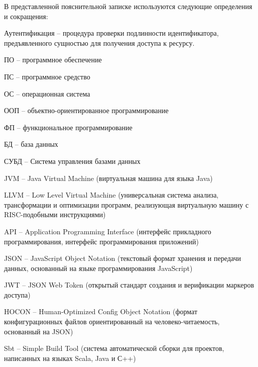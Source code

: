 
В представленной пояснительной записке используются следующие определения и сокращения:

Аутентификация -- процедура проверки подлинности идентификатора, предъявленного сущностью для получения доступа к ресурсу.

ПО -- программное обеспечение

ПС – программное средство

ОС -- операционная система

ООП -- объектно-ориентированное программирование

ФП -- функциональное программирование

БД -- база данных

СУБД -- Система управления базами данных

JVM -- Java Virtual Machine (виртуальная машина для языка Java)

LLVM -- Low Level Virtual Machine (универсальная система анализа, трансформации и оптимизации программ, реализующая виртуальную машину с RISC-подобными инструкциями)

API -- Application Programming Interface (интерфейс прикладного программирования, интерфейс программирования приложений)

JSON -- JavaScript Object Notation (текстовый формат хранения и передачи данных, основанный на языке программирования JavaScript)

JWT -- JSON Web Token (открытый стандарт создания и верификации маркеров доступа)

HOCON -- Human-Optimized Config Object Notation (формат конфигурационных файлов ориентированный на человеко-читаемость, основанный на JSON)

Sbt -- Simple Build Tool (система автоматической сборки для проектов, написанных на языках Scala, Java и С++)

\clearpage